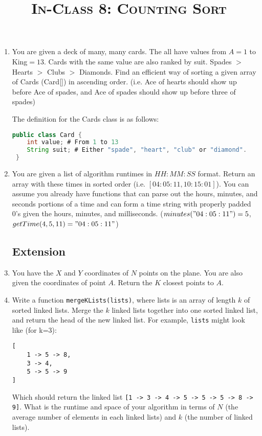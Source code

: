 \documentclass{article}
\title{\large{\textsc{In-Class 8: Counting Sort}}}
\date{}
\begin{document}
\maketitle

\begin{enumerate}

\subsection*{Core}

\item You are given a deck of many, many cards. The all have values from $A=1$ to King$=13$. Cards with the same value are also ranked by suit. Spades $>$ Hearts $>$ Clubs $>$ Diamonds. Find an efficient way of sorting a given array of Cards (Card[]) in ascending order. (i.e. Ace of hearts should show up before Ace of spades, and Ace of spades should show up before three of spades)

The definition for the Cards class is as follows:

\begin{lstlisting}[language=Java]
 public class Card {
    int value; # From 1 to 13
    String suit; # Either "spade", "heart", "club" or "diamond".
 }
\end{lstlisting}

\item You are given a list of algorithm runtimes in $HH:MM:SS$ format. Return an array with these times in sorted order (i.e. $[04:05:11,10:15:01]$). You can assume you already have functions that can parse out the hours, minutes, and seconds portions of a time and can form a time string with properly padded 0's given the hours, minutes, and milliseconds. ($minutes("04:05:11")=5$, $getTime(4,5,11)="04:05:11"$)

\subsection*{Extension}
    
\item You have the $X$ and $Y$ coordinates of $N$ points on the plane. You are also given the coordinates of point $A$. Return the $K$ closest points to $A$.

\item Write a function \texttt{mergeKLists(lists)}, where lists is an array of length $k$ of sorted linked lists. Merge the $k$ linked lists together into one sorted linked list, and return the head of the new linked list. For example, \texttt{lists} might look like (for k=3): %

\begin{lstlisting}
[
    1 -> 5 -> 8,
    3 -> 4,
    5 -> 5 -> 9
]
\end{lstlisting}

Which should return the linked list \texttt{[1 -> 3 -> 4 -> 5 -> 5 -> 5 -> 8 -> 9]}. What is the runtime and space of your algorithm in terms of $N$ (the average number of elements in each linked lists) and $k$ (the number of linked lists).
\end{enumerate}
\end{document}

